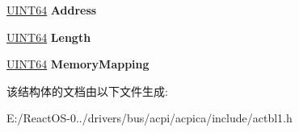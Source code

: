 \begin{DoxyCompactItemize}
\mbox{\label{structacpi__nfit__system__address_a1c9be6738dcf00db47cc52264a5bdb6f}} 
\hyperlink{_processor_bind_8h_a57be03562867144161c1bfee95ca8f7c}{U\+I\+N\+T64} {\bfseries Address}
\item 
\mbox{\label{structacpi__nfit__system__address_a3d814093d302a7b853f3a2279ea9f309}} 
\hyperlink{_processor_bind_8h_a57be03562867144161c1bfee95ca8f7c}{U\+I\+N\+T64} {\bfseries Length}
\item 
\mbox{\label{structacpi__nfit__system__address_aa20b6e84bb34d25cb0dcedf59d18d017}} 
\hyperlink{_processor_bind_8h_a57be03562867144161c1bfee95ca8f7c}{U\+I\+N\+T64} {\bfseries Memory\+Mapping}
\end{DoxyCompactItemize}


该结构体的文档由以下文件生成\+:\begin{DoxyCompactItemize}
\item 
E\+:/\+React\+O\+S-\/0../drivers/bus/acpi/acpica/include/actbl1.\+h\end{DoxyCompactItemize}
